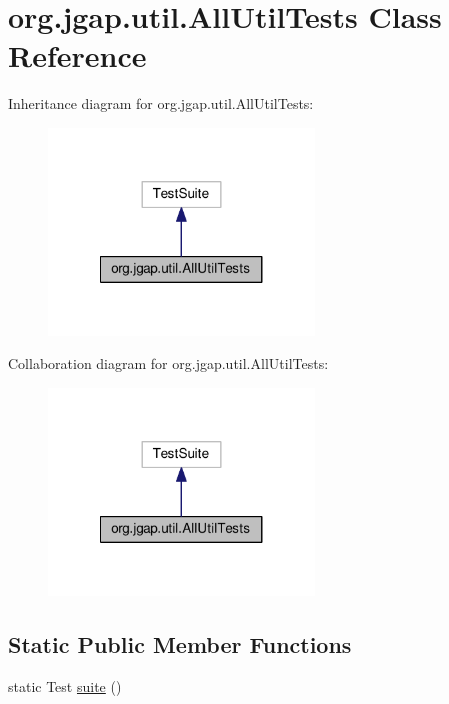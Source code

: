 \hypertarget{classorg_1_1jgap_1_1util_1_1_all_util_tests}{\section{org.\-jgap.\-util.\-All\-Util\-Tests Class Reference}
\label{classorg_1_1jgap_1_1util_1_1_all_util_tests}
}


Inheritance diagram for org.\-jgap.\-util.\-All\-Util\-Tests\-:
\nopagebreak
\begin{figure}[H]
\begin{center}
\leavevmode
\includegraphics[width=200pt]{classorg_1_1jgap_1_1util_1_1_all_util_tests__inherit__graph}
\end{center}
\end{figure}


Collaboration diagram for org.\-jgap.\-util.\-All\-Util\-Tests\-:
\nopagebreak
\begin{figure}[H]
\begin{center}
\leavevmode
\includegraphics[width=200pt]{classorg_1_1jgap_1_1util_1_1_all_util_tests__coll__graph}
\end{center}
\end{figure}
\subsection*{Static Public Member Functions}
\begin{DoxyCompactItemize}
\item 
static Test \hyperlink{classorg_1_1jgap_1_1util_1_1_all_util_tests_ac8f72c639495004ba478b7a0674b3133}{suite} ()
\end{DoxyCompactItemize}
